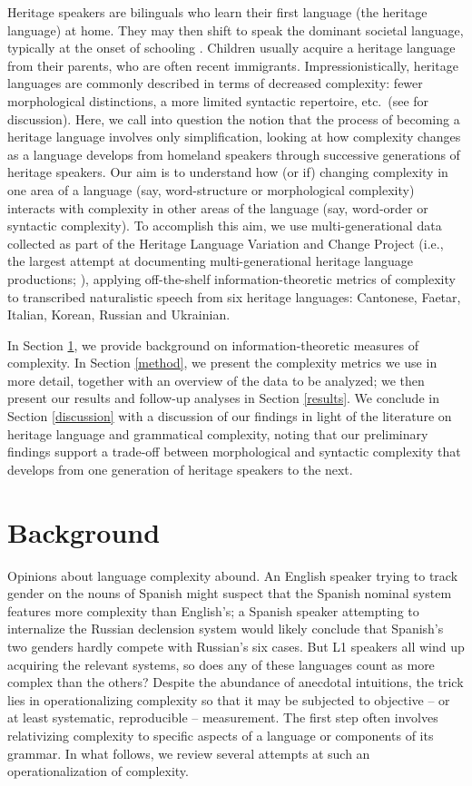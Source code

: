 \documentclass[output=paper]{langscibook}
\begin{document}
Heritage speakers are bilinguals who learn their first language (the heritage language) at home. They may then shift to speak the dominant societal language, typically at the onset of schooling \citep{rothman2009,scontrasetal2015frontiers,PolinskyScontras2020}. 
Children usually acquire a heritage language from their parents, who are often recent immigrants. 
Impressionistically, heritage languages are commonly described in terms of decreased complexity: fewer morphological distinctions, a more limited syntactic repertoire, etc.~(see \citealp{polinsky2018book} for discussion). 
Here, we call into question the notion that the process of becoming a heritage language involves only simplification, looking at how complexity changes as a language develops from homeland speakers through successive generations of heritage speakers. 
Our aim is to understand how (or if) changing complexity in one area of a language (say, word-structure or morphological complexity) interacts with complexity in other areas of the language (say, word-order or syntactic complexity). To accomplish this aim, we use multi-generational data collected as part of the Heritage Language Variation and Change Project (i.e., the largest attempt at documenting multi-generational heritage language productions; \citealp{nagy2009heritage}), applying off-the-shelf information-theoretic metrics of complexity to transcribed naturalistic speech from six heritage languages: Cantonese, Faetar, Italian, Korean, Russian and Ukrainian.

In Section \ref{background}, we provide background on information-theoretic measures of complexity. In Section \ref{method}, we present the complexity metrics we use in more detail, together with an overview of the data to be analyzed; we then present our results and follow-up analyses in Section \ref{results}.  
We conclude in Section \ref{discussion} with a discussion of our findings in light of the literature on heritage language and grammatical complexity, noting that our preliminary findings support a trade-off between morphological and syntactic complexity that develops from one generation of heritage speakers to the next.


\section{Background}
\label{background}

Opinions about language complexity abound. An English speaker trying to track gender on the nouns of Spanish might suspect that the Spanish nominal system features more complexity than English's; a Spanish speaker attempting to internalize the Russian declension system would likely conclude that Spanish's two genders hardly compete with Russian's six cases. But L1 speakers all wind up acquiring the relevant systems, so does any of these languages count as more complex than the others? Despite the abundance of anecdotal intuitions, the trick lies in operationalizing complexity so that it may be subjected to objective -- or at least systematic, reproducible -- measurement. The first step often involves relativizing complexity to specific aspects of a language or components of its grammar. In what follows, we review several attempts at such an operationalization of complexity.
\end{document}
